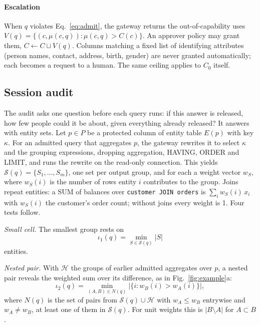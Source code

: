 \documentclass[10pt,journal,compsoc]{IEEEtran}
\begin{document}
\paragraph*{Escalation} When $q$ violates Eq.~\ref{eq:admit}, the gateway returns the out-of-capability uses $V(q)=\{(c,\mu(c,q)):\mu(c,q)>C(c)\}$. An approver policy may grant them, $C\leftarrow C\sqcup V(q)$. Columns matching a fixed list of identifying attributes (person names, contact, address, birth, gender) are never granted automatically; each becomes a request to a human. The same ceiling applies to $C_0$ itself.

\subsection{Session audit}\label{sec:audit}
The audit asks one question before each query runs: if this answer is released, how few people could it be about, given everything already released? It answers with entity sets. Let $p\in P$ be a protected column of entity table $E(p)$ with key $\kappa$. For an admitted query that aggregates $p$, the gateway rewrites it to select $\kappa$ and the grouping expressions, dropping aggregation, HAVING, ORDER and LIMIT, and runs the rewrite on the read-only connection. This yields $\mathcal{S}(q)=\{S_1,\dots,S_m\}$, one set per output group, and for each a weight vector $w_S$, where $w_S(i)$ is the number of rows entity $i$ contributes to the group. Joins repeat entities: a SUM of balances over \texttt{customer JOIN orders} is $\sum_i w_S(i)\,x_i$ with $w_S(i)$ the customer's order count; without joins every weight is 1. Four tests follow.

\emph{Small cell.} The smallest group rests on
\begin{equation}\label{eq:cell}
\iota_1(q)=\min_{S\in\mathcal{S}(q)}|S|
\end{equation}
entities.

\emph{Nested pair.} With $\mathcal{H}$ the groups of earlier admitted aggregates over $p$, a nested pair reveals the weighted sum over its difference, as in Fig.~\ref{fig:example}a:
\begin{equation}\label{eq:pair}
\iota_2(q)=\min_{(A,B)\in N(q)}\bigl|\{i: w_B(i)>w_A(i)\}\bigr|,
\end{equation}
where $N(q)$ is the set of pairs from $\mathcal{S}(q)\cup\mathcal{H}$ with $w_A\le w_B$ entrywise and $w_A\ne w_B$, at least one of them in $\mathcal{S}(q)$. For unit weights this is $|B\setminus A|$ for $A\subset B$.
\end{document}

